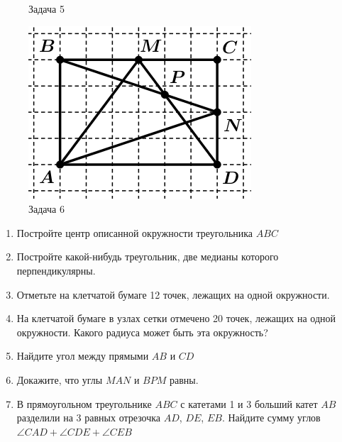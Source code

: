 \documentclass{article}
\begin{document}
\begin{figure}[h]
\begin{center}
\begin{minipage}[h]{0.3\linewidth}
			\caption{Задача 5} %
			\label{ris:5} %
		\end{minipage}
	\hfill 
		\begin{minipage}[h]{0.3\linewidth}
			\includegraphics[width=1\linewidth]{6.png}
			\caption{Задача 6} %
			\label{ris:6} %
		\end{minipage}
	\end{center}
\end{figure}

\begin{enumerate}[label*=\protect\fbox{\arabic{enumi}}]

\item Постройте центр описанной окружности треугольника $ABC$

\item Постройте какой-нибудь треугольник, две медианы которого перпендикулярны.

\item Отметьте на клетчатой бумаге 12 точек, лежащих на одной окружности.

\item На клетчатой бумаге в узлах сетки отмечено 20 точек, лежащих на одной окружности. Какого радиуса может быть эта окружность?

\item Найдите угол между прямыми $AB$ и $CD$

\item Докажите, что углы $MAN$ и $BPM$ равны.

\item В прямоугольном треугольнике $ABC$ с катетами 1 и 3 больший катет $AB$ разделили на 3 равных отрезочка $AD$, $DE$, $EB$. Найдите сумму углов $\angle CAD + \angle CDE + \angle CEB$

\end{enumerate}
\end{document}
